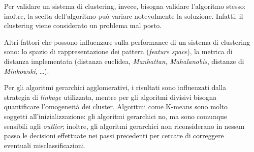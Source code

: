 \documentclass[\main/main.tex]{subfiles}
\begin{document}
Per validare un sistema di clustering, invece, bisogna validare l'algoritmo stesso: inoltre, la scelta dell'algoritmo può variare notevolmente la soluzione. Infatti, il clustering viene considerato un problema mal posto.

Altri fattori che possono influenzare sulla performance di un sistema di clustering sono: lo spazio di rappresentazione dei pattern (\textit{feature space}), la metrica di distanza implementata (distanza euclidea, \textit{Manhattan}, \textit{Mahalanobis}, distanze di \textit{Minkowski}, \dots ).

Per gli algoritmi gerarchici agglomerativi, i risultati sono influenzati dalla strategia di \textit{linkage} utilizzata, mentre per gli algoritmi divisivi bisogna quantificare l'omogeneità dei cluster.
Algoritmi come K-means sono molto soggetti all'inizializzazione: gli algoritmi gerarchici no, ma sono comunque sensibili agli \textit{outlier}; inoltre, gli algoritmi gerarchici non riconsiderano in nessun passo le decisioni effettuate nei passi precedenti per cercare di correggere eventuali misclassificazioni.
\end{document}
